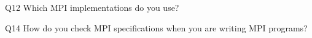 \begin{description}%
\item{Q12} Which MPI implementations do you use?%
\item{Q14} How do you check MPI specifications when you are writing MPI programs?%
\end{description}%
